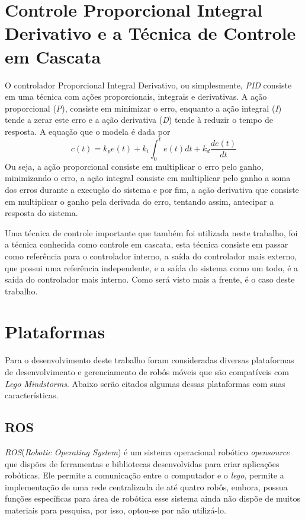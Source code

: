 \section{Controle Proporcional Integral Derivativo e a Técnica de Controle em Cascata}
\label{sec:pid}
O controlador Proporcional Integral Derivativo, ou simplesmente, \emph{PID} consiste em uma técnica com ações proporcionais, integrais e derivativas. A ação proporcional (\emph{P}), consiste em minimizar o erro, enquanto a ação integral (\emph{I}) tende a zerar este erro e a ação derivativa (\emph{D}) tende à reduzir o tempo de resposta. A equação que o modela é dada por
\begin{equation}
c(t) = k_{p}e(t) + k_{i}\int_0^t e(t) dt + k_{d}\dfrac{de(t)}{dt}
\label{eq:pid}
\end{equation}
Ou seja, a ação proporcional consiste em multiplicar o erro pelo ganho, minimizando o erro, a ação integral consiste em multiplicar pelo ganho a soma dos erros durante a execução do sistema e por fim, a ação derivativa que consiste em multiplicar o ganho pela derivada do erro, tentando assim, antecipar a resposta do sistema. 

Uma técnica de controle importante que também foi utilizada neste trabalho, foi a técnica conhecida como controle em cascata, esta técnica consiste em passar como referência para o controlador interno, a saída do controlador mais externo, que possui uma referência independente, e a saída do sistema como um todo, é a saída do controlador mais interno. Como será visto mais a frente, é o caso deste trabalho.

\section{Plataformas}
\label{sec:plataformas}
Para o desenvolvimento deste trabalho foram consideradas diversas plataformas de desenvolvimento e gerenciamento de robôs móveis que são compatíveis com \emph{Lego Mindstorms\textregistered}. Abaixo serão citados algumas dessas plataformas com suas características.

\subsection{ROS}
\label{subsec:ROS}
\emph{ROS}(\emph{Robotic Operating System}) é um sistema operacional robótico \emph{opensource} que dispões de ferramentas e bibliotecas desenvolvidas para criar aplicações robóticas.%
Ele permite a comunicação entre o computador e o \emph{lego}, permite a implementação de uma rede centralizada de até quatro robôs, embora, possua funções específicas para área de robótica esse sistema ainda não dispõe de muitos materiais para pesquisa, por isso, optou-se por não  utilizá-lo.

